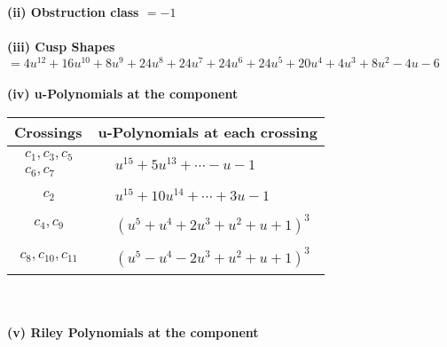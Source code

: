 \documentclass[1p]{elsarticle_modified}
\theoremstyle{definition}
\begin{document}
\flushleft \textbf{(ii) Obstruction class $= -1$}\\~\\
\flushleft \textbf{(iii) Cusp Shapes $= 4 u^{12}+16 u^{10}+8 u^9+24 u^8+24 u^7+24 u^6+24 u^5+20 u^4+4 u^3+8 u^2-4 u-6$}\\~\\
\newpage\renewcommand{\arraystretch}{1}
\flushleft \textbf{(iv) u-Polynomials at the component}\newline \\
\begin{tabular}{m{50pt}|m{274pt}}
Crossings & \hspace{64pt}u-Polynomials at each crossing \\
\hline $$\begin{aligned}c_{1},c_{3},c_{5}\\c_{6},c_{7}\end{aligned}$$&$\begin{aligned}
&u^{15}+5 u^{13}+\cdots- u-1
\end{aligned}$\\
\hline $$\begin{aligned}c_{2}\end{aligned}$$&$\begin{aligned}
&u^{15}+10 u^{14}+\cdots+3 u-1
\end{aligned}$\\
\hline $$\begin{aligned}c_{4},c_{9}\end{aligned}$$&$\begin{aligned}
&(u^5+u^4+2 u^3+u^2+u+1)^3
\end{aligned}$\\
\hline $$\begin{aligned}c_{8},c_{10},c_{11}\end{aligned}$$&$\begin{aligned}
&(u^5- u^4-2 u^3+u^2+u+1)^3
\end{aligned}$\\
\hline
\end{tabular}\\~\\
\newpage\renewcommand{\arraystretch}{1}
\flushleft \textbf{(v) Riley Polynomials at the component}\newline \\
\end{document}
